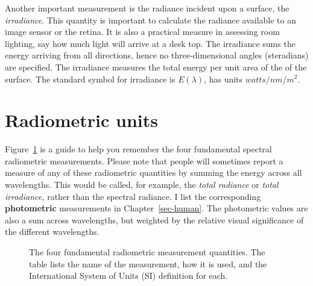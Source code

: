 \documentclass[
  letterpaper,
]{book}
\begin{document}
Another important measurement is the radiance incident upon a surface,
the \emph{irradiance}. This quantity is important to calculate the
radiance available to an image sensor or the retina. It is also a
practical measure in assessing room lighting, say how much light will
arrive at a desk top. The irradiance sums the energy arriving from all
directions, hence no three-dimensional angles (steradians) are
specified. The irradiance measures the total energy per unit area of the
of the surface. The standard symbol for irradiance is \(E(\lambda)\),
has units \(watts/nm/m^2\).

\section{Radiometric units}\label{radiometric-units-1}

Figure~\ref{fig-radiometry-units} is a guide to help you remember the
four fundamental spectral radiometric measurements. Please note that
people will sometimes report a measure of any of these radiometric
quantities by summing the energy across all wavelengths. This would be
called, for example, the \emph{total radiance} or \emph{total
irradiance,} rather than the spectral radiance. I list the corresponding
\textbf{photometric} measurements in Chapter~\ref{sec-human}. The
photometric values are also a sum across wavelengths, but weighted by
the relative visual significance of the different wavelengths.

\begin{figure}


\caption{\label{fig-radiometry-units}The four fundamental radiometric
measurement quantities. The table lists the name of the measurement, how
it is used, and the International System of Units (SI) definition for
each.}

\end{figure}%
\end{document}
